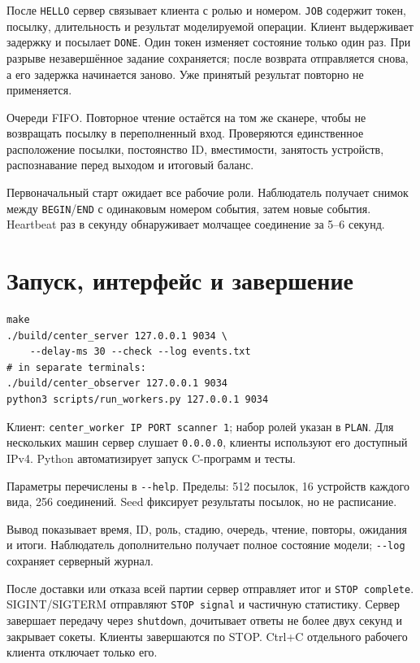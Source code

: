 \begin{remark}
После \texttt{HELLO} сервер связывает клиента с ролью и номером. \texttt{JOB} содержит токен, посылку, длительность и результат моделируемой операции. Клиент выдерживает задержку и посылает \texttt{DONE}. Один токен изменяет состояние только один раз. При разрыве незавершённое задание сохраняется; после возврата отправляется снова, а его задержка начинается заново. Уже принятый результат повторно не применяется.
\end{remark}

Очереди FIFO. Повторное чтение остаётся на том же сканере, чтобы не возвращать посылку в переполненный вход. Проверяются единственное расположение посылки, постоянство ID, вместимости, занятость устройств, распознавание перед выходом и итоговый баланс.

Первоначальный старт ожидает все рабочие роли. Наблюдатель получает снимок между \texttt{BEGIN}/\texttt{END} с одинаковым номером события, затем новые события. Heartbeat раз в секунду обнаруживает молчащее соединение за 5--6 секунд.

\newpage
\section{Запуск, интерфейс и завершение}
\begin{lstlisting}
make
./build/center_server 127.0.0.1 9034 \
    --delay-ms 30 --check --log events.txt
# in separate terminals:
./build/center_observer 127.0.0.1 9034
python3 scripts/run_workers.py 127.0.0.1 9034
\end{lstlisting}
Клиент: \texttt{center\_worker IP PORT scanner 1}; набор ролей указан в \texttt{PLAN}. Для нескольких машин сервер слушает \texttt{0.0.0.0}, клиенты используют его доступный IPv4. Python автоматизирует запуск C-программ и тесты.

Параметры перечислены в \texttt{-{}-help}. Пределы: 512 посылок, 16 устройств каждого вида, 256 соединений. Seed фиксирует результаты посылок, но не расписание.

Вывод показывает время, ID, роль, стадию, очередь, чтение, повторы, ожидания и итоги. Наблюдатель дополнительно получает полное состояние модели; \texttt{-{}-log} сохраняет серверный журнал.

После доставки или отказа всей партии сервер отправляет итог и \texttt{STOP complete}. SIGINT/SIGTERM отправляют \texttt{STOP signal} и частичную статистику. Сервер завершает передачу через \texttt{shutdown}, дочитывает ответы не более двух секунд и закрывает сокеты. Клиенты завершаются по STOP. Ctrl+C отдельного рабочего клиента отключает только его.

